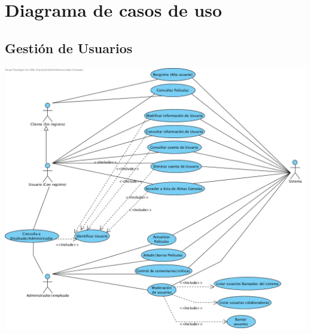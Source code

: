 \documentclass{article}
\begin{document}
\pagebreak

\section{Diagrama de casos de uso}
\subsection*{Gestión de Usuarios}
		\begin{center}
   			\includegraphics[scale=0.65]{GestiondeUsuarios.png}
   		\end{center}	
\pagebreak
\end{document}
